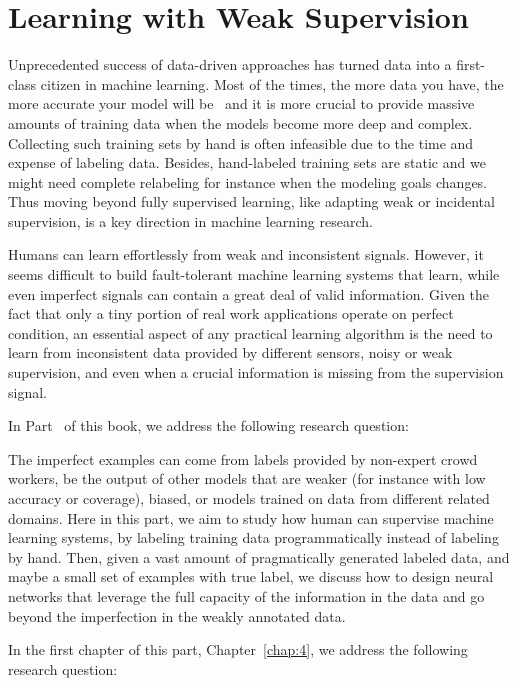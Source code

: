 \part{Learning with Weak Supervision}
\label{part2}
Unprecedented success of data-driven approaches has turned data into a first-class citizen in machine learning. Most of the times, the more data you have, the more accurate your model will be~\citep{halevy2009unreasonable,sun2017revisiting} and it is more crucial to provide massive amounts of training data when the models become more deep and complex.
Collecting such training sets by hand is often infeasible due to the time and expense of labeling data. Besides, hand-labeled training sets are static and we might need complete relabeling for instance when the modeling goals changes. Thus moving beyond fully supervised learning, like adapting weak or incidental supervision, is a key direction in machine learning research.  

Humans can learn effortlessly from weak and inconsistent signals. However, it seems difficult to build fault-tolerant machine learning systems that learn, while even imperfect signals can contain a great deal of valid information.
Given the fact that only a tiny portion of real work applications operate on perfect condition, an essential aspect of any practical learning algorithm is the need to learn from inconsistent data provided by different sensors, noisy or weak supervision, and even when a crucial information is missing from the supervision signal.

In Part~\ref{part2} of this book, we address the following research question:

The imperfect examples can come from labels provided by non-expert crowd workers, be the output of other models that are weaker (for instance with low accuracy or coverage), biased, or models trained on data from different related domains. 
Here in this part, we aim to study how human can supervise machine learning systems, by labeling training data programmatically instead of labeling by hand. Then, given a vast amount of pragmatically generated labeled data, and maybe a small set of examples with true label,  we discuss how to design neural networks that leverage the full capacity of the information in the data and go beyond the imperfection in the weakly annotated data.


In the first chapter of this part, Chapter~\ref{chap:4}, we address the following research question:

